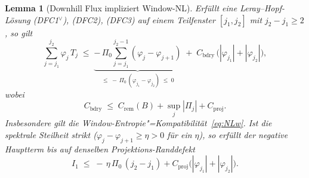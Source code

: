 \documentclass[12pt,a4paper]{article}
\theoremstyle{breakdef}
\theoremstyle{breakplain}
\newtheorem{lemma}[definition]{Lemma}
\theoremstyle{breakdef}
\begin{document}
\begin{lemma}[Downhill Flux impliziert Window-NL]\label{lem:DFC-implies-NLw}
Erfüllt eine Leray--Hopf-Lösung \textup{(DFC1$^\vee$), (DFC2), (DFC3)}
auf einem
Teilfenster $[j_1, j_2]$ mit $j_2 - j_1 \ge 2$, so gilt
\begin{equation}\label{eq:DFC-quantitative}
  \sum_{j=j_1}^{j_2} \varphi_j\,T_j
  \;\le\;
  \underbrace{-\,\Pi_0
    \sum_{j=j_1}^{j_2-1}(\varphi_j - \varphi_{j+1})}_{\le\;
    -\,\Pi_0\,(\varphi_{j_1}-\varphi_{j_2})\;\le\; 0}
  \;+\;
  C_{\mathrm{bdry}}\,
  \bigl(|\varphi_{j_1}| + |\varphi_{j_2}|\bigr),
\end{equation}
wobei
\[
  C_{\mathrm{bdry}}
  \;\le\;
  C_{\mathrm{rem}}(B)+\sup_j|\Pi_j|+C_{\mathrm{proj}}.
\]
Insbesondere
gilt die Window-Entropie"=Kompatibilität~\eqref{eq:NLw}. Ist die
spektrale Steilheit strikt ($\varphi_j - \varphi_{j+1} \ge \eta > 0$
für ein $\eta$), so erfüllt der negative Hauptterm bis auf denselben
Projektions-Randdefekt
\begin{equation}\label{eq:bulk-strict}
  I_1 \;\le\; -\,\eta\,\Pi_0\,(j_2 - j_1)
  + C_{\mathrm{proj}}\bigl(|\varphi_{j_1}|+|\varphi_{j_2}|\bigr).
\end{equation}
\end{lemma}
\end{document}
